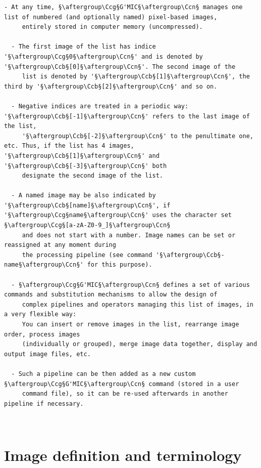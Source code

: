 \documentclass[a4paper,10.5pt,twoside]{book}
\def\Ccb{\color{cb}}
\def\Ccg{\color{cc}}
\def\Ccn{\color{black}}
\begin{document}
\begin{lstlisting}[escapechar=§]
  - At any time, §\aftergroup\Ccg§G'MIC§\aftergroup\Ccn§ manages one list of numbered (and optionally named) pixel-based images, 
     entirely stored in computer memory (uncompressed). 
 
  - The first image of the list has indice '§\aftergroup\Ccg§0§\aftergroup\Ccn§' and is denoted by '§\aftergroup\Ccb§[0]§\aftergroup\Ccn§'. The second image of the 
     list is denoted by '§\aftergroup\Ccb§[1]§\aftergroup\Ccn§', the third by '§\aftergroup\Ccb§[2]§\aftergroup\Ccn§' and so on. 
 
  - Negative indices are treated in a periodic way: '§\aftergroup\Ccb§[-1]§\aftergroup\Ccn§' refers to the last image of the list, 
     '§\aftergroup\Ccb§[-2]§\aftergroup\Ccn§' to the penultimate one, etc. Thus, if the list has 4 images, '§\aftergroup\Ccb§[1]§\aftergroup\Ccn§' and '§\aftergroup\Ccb§[-3]§\aftergroup\Ccn§' both 
     designate the second image of the list. 
 
  - A named image may be also indicated by '§\aftergroup\Ccb§[name]§\aftergroup\Ccn§', if '§\aftergroup\Ccg§name§\aftergroup\Ccn§' uses the character set §\aftergroup\Ccg§[a-zA-Z0-9_]§\aftergroup\Ccn§ 
     and does not start with a number. Image names can be set or reassigned at any moment during 
     the processing pipeline (see command '§\aftergroup\Ccb§-name§\aftergroup\Ccn§' for this purpose). 
 
  - §\aftergroup\Ccg§G'MIC§\aftergroup\Ccn§ defines a set of various commands and substitution mechanisms to allow the design of 
     complex pipelines and operators managing this list of images, in a very flexible way: 
     You can insert or remove images in the list, rearrange image order, process images 
     (individually or grouped), merge image data together, display and output image files, etc. 
 
  - Such a pipeline can be then added as a new custom §\aftergroup\Ccg§G'MIC§\aftergroup\Ccn§ command (stored in a user 
     command file), so it can be re-used afterwards in another pipeline if necessary.
\end{lstlisting}
\normalsize
~\\\section{Image definition and terminology}
\small
\end{document}
